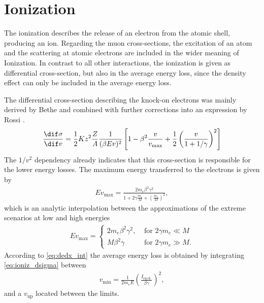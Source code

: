 %
%

\section{Ionization} \label{sec:ioniz}

The ionization describes the release of an electron from the atomic shell, producing an ion.
Regarding the muon cross-sections, the excitation of an atom and the scattering at atomic electrons are included in the wider meaning of Ionization.
In contrast to all other interactions, the ionization is given as differential cross-section, but also in the average energy loss, since the density effect can only be included in the average energy loss.

The differential cross-section describing the knock-on electrons was mainly derived by Bethe \cite{Bethe30} and combined with further corrections into an expression by Rossi \cite{Rossi52}.
\begin{align} \label{eq:ioniz_dsigma}
\frac{\dif \sigma}{\dif v} = 
    \frac{1}{2} K z^2 \frac{Z}{A} \frac{1}{(\beta Ev)^2}
    \left[ 1 - \beta^2 \frac{v}{v_{\text{max}}} + \frac{1}{2} \left( \frac{v}{1 + 1/\gamma} \right)^2
    \right]
\end{align}
The $1/v^2$ dependency already indicates that this cross-section is responsible for the lower energy losses.
The maximum energy transferred to the electrons is given by \cite{PDG20}
\begin{align} \label{eq:ioniz_vmax}
    E v_{\text{max}} = \frac{2 m_e \beta^2 \gamma^2}{1 + 2 \gamma \frac{m_e}{M} + \left(\frac{m_e}{M}\right)^2},
\end{align}
which is an analytic interpolation between the approximations of the extreme scenarios at low and high energies
\begin{align}
    Ev_{\text{max}} =
    \begin{cases} 
        2m_e\beta^2 \gamma^2, & \text{ for } 2\gamma m_e \ll M \\
        M \beta^2 \gamma & \text{ for } 2\gamma m_e \gg M.
    \end{cases}
\end{align}
According to \eqref{eq:dedx_int} the average energy loss is obtained by integrating \eqref{eq:ioniz_dsigma} between
\begin{align}
    v_{\text{min}} = \frac{1}{2m_eE} \left( \frac{I_{\text{excit.}}}{\beta\gamma} \right)^2,
\end{align}
and a $v_{\text{up}}$ located between the limits.
